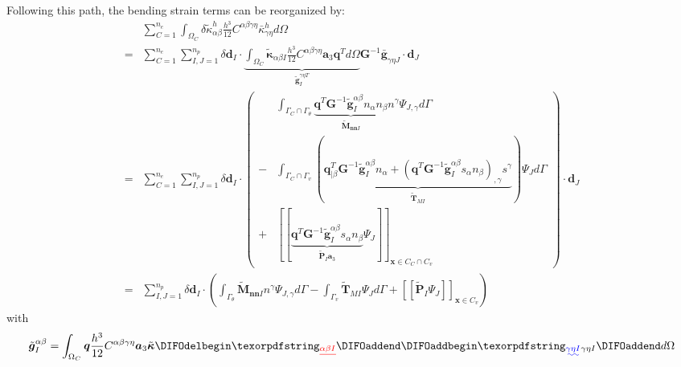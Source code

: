 Following this path, the bending strain terms can be reorganized by:
\begin{equation}
\begin{split}
&\sum_{C=1}^{n_e}\int_{\Omega_C} \delta \tilde \kappa_{\alpha\beta}^h \frac{h^3}{12}C^{\alpha\beta\gamma\eta}\bar \kappa^h_{\gamma\eta} d\Omega \\
        =&\sum_{C=1}^{n_e}\sum_{I,J=1}^{n_p}\delta \boldsymbol d_I \cdot \underbrace{\int_{\Omega_C} \tilde{\boldsymbol \kappa}_{\alpha\beta I} \frac{h^3}{12}C^{\alpha\beta\gamma\eta} \boldsymbol a_3 \boldsymbol q^T d\Omega}_{\tilde{\boldsymbol g}^{\gamma\eta T}_I} \boldsymbol G^{-1} \bar{\boldsymbol g}_{\gamma\eta J} \cdot \boldsymbol d_J \\
        =&\sum_{C=1}^{n_e}\sum_{I,J=1}^{n_p}\delta \boldsymbol d_I \cdot \left (
        \begin{split}
                &\int_{\Gamma_C\cap\Gamma_\theta} \underbrace{\boldsymbol q^T \boldsymbol G^{-1}\tilde{\boldsymbol g}^{\alpha\beta}_I n_\alpha n_\beta}_{\tilde{\boldsymbol M}_{\boldsymbol{nn} I}} n^\gamma\Psi_{J,\gamma} d\Gamma \\
                - &\int_{\Gamma_C\cap\Gamma_v} (\underbrace{\boldsymbol q^T_{\vert \beta} \boldsymbol G^{-1}\tilde{\boldsymbol g}^{\alpha\beta}_I n_\alpha + (\boldsymbol q^T \boldsymbol G^{-1}\tilde{\boldsymbol g}^{\alpha\beta}_I s_\alpha n_\beta)_{,\gamma}s^\gamma}_{\tilde{\boldsymbol T}_{M I}}) \Psi_J d\Gamma \\
                + &[[\underbrace{\boldsymbol q^T \boldsymbol G^{-1}\tilde{\boldsymbol g}^{\alpha\beta}_I s_\alpha n_\beta}_{\tilde{\boldsymbol P}_I \boldsymbol a_3} \Psi_J ]]_{\boldsymbol x\in C_C\cap C_v}
        \end{split}
       \right ) \cdot \boldsymbol d_J \\
       =&\sum_{I,J=1}^{n_p}\delta \boldsymbol d_I \cdot (
       \int_{\Gamma_\theta} \tilde{\boldsymbol M}_{\boldsymbol{nn} I} n^\gamma\Psi_{J,\gamma} d\Gamma
        - \int_{\Gamma_v} \tilde{\boldsymbol T}_{M I} \Psi_J d\Gamma
        + [[\tilde{\boldsymbol P}_I \Psi_J ]]_{\boldsymbol x\in C_v})
\end{split}
\end{equation}
with
\begin{equation}
\tilde{\boldsymbol g}^{\alpha\beta}_I = \int_{\Omega_C} \boldsymbol q \frac{h^3}{12}C^{\alpha\beta\gamma\eta} \boldsymbol a_3 \tilde{\boldsymbol \kappa}\DIFdelbegin \DIFdel{_{\alpha\beta I}}\DIFdelend \DIFaddbegin \DIFadd{_{\gamma\eta I}}\DIFaddend d\Omega
\end{equation}
